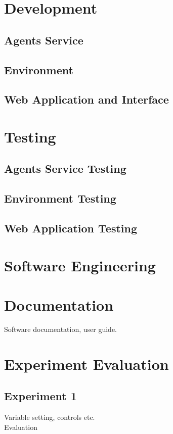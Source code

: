 \documentclass[]{final_report}
\begin{document}
\section{Development}

\subsection{Agents Service}
\subsection{Environment}
\subsection{Web Application and Interface}

\section{Testing}

\subsection{Agents Service Testing}
\subsection{Environment Testing}
\subsection{Web Application Testing}

\section{Software Engineering}

\section{Documentation}
Software documentation, user guide.

\section{Experiment Evaluation}

\subsection{Experiment 1}
Variable setting, controls etc.\\
Evaluation
\end{document}
